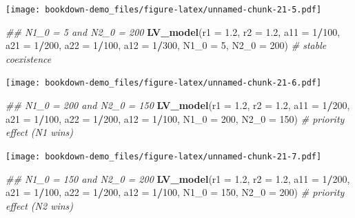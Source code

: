 \documentclass[
]{book}
\newenvironment{Shaded}{\begin{snugshade}}{\end{snugshade}}
\newcommand{\CommentTok}[1]{\textcolor[rgb]{0.56,0.35,0.01}{\textit{#1}}}
\newcommand{\DataTypeTok}[1]{\textcolor[rgb]{0.13,0.29,0.53}{#1}}
\newcommand{\DecValTok}[1]{\textcolor[rgb]{0.00,0.00,0.81}{#1}}
\newcommand{\FloatTok}[1]{\textcolor[rgb]{0.00,0.00,0.81}{#1}}
\newcommand{\KeywordTok}[1]{\textcolor[rgb]{0.13,0.29,0.53}{\textbf{#1}}}
\newcommand{\NormalTok}[1]{#1}
\newcommand{\OperatorTok}[1]{\textcolor[rgb]{0.81,0.36,0.00}{\textbf{#1}}}
\begin{document}
\texttt{[image: bookdown-demo\_files/figure-latex/unnamed-chunk-21-5.pdf]}

\begin{Shaded}
\begin{Highlighting}[]
  \CommentTok{## N1_0 = 5 and N2_0 = 200}
  \KeywordTok{LV_model}\NormalTok{(}\DataTypeTok{r1 =} \FloatTok{1.2}\NormalTok{, }\DataTypeTok{r2 =} \FloatTok{1.2}\NormalTok{, }\DataTypeTok{a11 =} \DecValTok{1}\OperatorTok{/}\DecValTok{100}\NormalTok{, }\DataTypeTok{a21 =} \DecValTok{1}\OperatorTok{/}\DecValTok{200}\NormalTok{, }\DataTypeTok{a22 =} \DecValTok{1}\OperatorTok{/}\DecValTok{100}\NormalTok{, }\DataTypeTok{a12 =} \DecValTok{1}\OperatorTok{/}\DecValTok{300}\NormalTok{, }\DataTypeTok{N1_0 =} \DecValTok{5}\NormalTok{, }\DataTypeTok{N2_0 =} \DecValTok{200}\NormalTok{)  }\CommentTok{# stable coexistence}
\end{Highlighting}
\end{Shaded}

\texttt{[image: bookdown-demo\_files/figure-latex/unnamed-chunk-21-6.pdf]}

\begin{Shaded}
\begin{Highlighting}[]
  \CommentTok{## N1_0 = 200 and N2_0 = 150}
  \KeywordTok{LV_model}\NormalTok{(}\DataTypeTok{r1 =} \FloatTok{1.2}\NormalTok{, }\DataTypeTok{r2 =} \FloatTok{1.2}\NormalTok{, }\DataTypeTok{a11 =} \DecValTok{1}\OperatorTok{/}\DecValTok{200}\NormalTok{, }\DataTypeTok{a21 =} \DecValTok{1}\OperatorTok{/}\DecValTok{100}\NormalTok{, }\DataTypeTok{a22 =} \DecValTok{1}\OperatorTok{/}\DecValTok{200}\NormalTok{, }\DataTypeTok{a12 =} \DecValTok{1}\OperatorTok{/}\DecValTok{100}\NormalTok{, }\DataTypeTok{N1_0 =} \DecValTok{200}\NormalTok{, }\DataTypeTok{N2_0 =} \DecValTok{150}\NormalTok{)  }\CommentTok{# priority effect (N1 wins)}
\end{Highlighting}
\end{Shaded}

\texttt{[image: bookdown-demo\_files/figure-latex/unnamed-chunk-21-7.pdf]}

\begin{Shaded}
\begin{Highlighting}[]
  \CommentTok{## N1_0 = 150 and N2_0 = 200}
  \KeywordTok{LV_model}\NormalTok{(}\DataTypeTok{r1 =} \FloatTok{1.2}\NormalTok{, }\DataTypeTok{r2 =} \FloatTok{1.2}\NormalTok{, }\DataTypeTok{a11 =} \DecValTok{1}\OperatorTok{/}\DecValTok{200}\NormalTok{, }\DataTypeTok{a21 =} \DecValTok{1}\OperatorTok{/}\DecValTok{100}\NormalTok{, }\DataTypeTok{a22 =} \DecValTok{1}\OperatorTok{/}\DecValTok{200}\NormalTok{, }\DataTypeTok{a12 =} \DecValTok{1}\OperatorTok{/}\DecValTok{100}\NormalTok{, }\DataTypeTok{N1_0 =} \DecValTok{150}\NormalTok{, }\DataTypeTok{N2_0 =} \DecValTok{200}\NormalTok{)  }\CommentTok{# priority effect (N2 wins)}
\end{Highlighting}
\end{Shaded}
\end{document}
